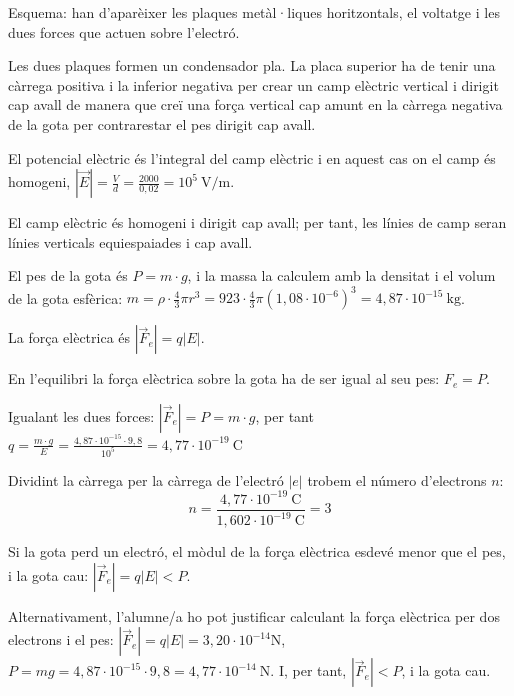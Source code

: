 \begin{solapartat}

 Esquema: han d'aparèixer les plaques metàl·liques horitzontals, el voltatge i les dues forces que actuen sobre l'electró.

 Les dues plaques formen un condensador pla. La placa superior ha de tenir una càrrega positiva i la inferior negativa per crear un camp elèctric vertical i dirigit cap avall de manera que creï una força vertical cap amunt en la càrrega negativa de la gota per contrarestar el pes dirigit cap avall.

 El potencial elèctric és l'integral del camp elèctric i en aquest cas on el camp és homogeni, $|\vec{E}| = \frac{V}{d} = \frac{2000}{0,02} = 10^{5}\ \mathrm{V/m}$.

 El camp elèctric és homogeni i dirigit cap avall; per tant, les línies de camp seran línies verticals equiespaiades i cap avall.
\end{solapartat}

\begin{solapartat}
 El pes de la gota és $P = m\cdot g$, i la massa la calculem amb la densitat i el volum de la gota esfèrica: $m = \rho\cdot\frac{4}{3}\pi r^3 = 923\cdot\frac{4}{3}\pi(1,08\cdot 10^{-6})^3 = 4,87\cdot 10^{-15}\ \mathrm{kg}$.

La força elèctrica és $|\vec{F}_e| = q|E|$.

En l'equilibri la força elèctrica sobre la gota ha de ser igual al seu pes: $F_e = P$.

Igualant les dues forces: $|\vec{F}_e| = P = m\cdot g$, per tant $q = \frac{m\cdot g}{E} = \frac{4,87\cdot 10^{-15}\cdot 9,8}{10^{5}} = 4,77\cdot 10^{-19}\ \mathrm{C}$

 Dividint la càrrega per la càrrega de l'electró $|e|$ trobem el número d'electrons $n$:
\[ n = \frac{4,77\cdot 10^{-19}\ \mathrm{C}}{1,602\cdot 10^{-19}\ \mathrm{C}} = 3 \]

 Si la gota perd un electró, el mòdul de la força elèctrica esdevé menor que el pes, i la gota cau: $|\vec{F}_e| = q|E| < P$.

Alternativament, l'alumne/a ho pot justificar calculant la força elèctrica per dos electrons i el pes: $|\vec{F}_e| = q|E| = 3,20\cdot 10^{-14}\mathrm{N}$, $P = mg = 4,87\cdot 10^{-15}\cdot 9,8 = 4,77\cdot 10^{-14}\ \mathrm{N}$. I, per tant, $|\vec{F}_e| < P$, i la gota cau.
\end{solapartat}
